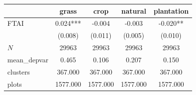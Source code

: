 {
\def\sym#1{\ifmmode^{#1}\else\(^{#1}\)\fi}
\begin{tabular}{l*{4}{c}}
\toprule
          &\multicolumn{1}{c}{grass}&\multicolumn{1}{c}{crop}&\multicolumn{1}{c}{natural}&\multicolumn{1}{c}{plantation}\\
\midrule
FTAI      &    0.024***&   -0.004   &   -0.003   &   -0.020** \\
          &  (0.008)   &  (0.011)   &  (0.005)   &  (0.010)   \\
\midrule
\(N\)     &    29963   &    29963   &    29963   &    29963   \\
mean\_depvar&    0.465   &    0.106   &    0.207   &    0.150   \\
clusters  &  367.000   &  367.000   &  367.000   &  367.000   \\
plots     & 1577.000   & 1577.000   & 1577.000   & 1577.000   \\
\bottomrule
\end{tabular}
}

